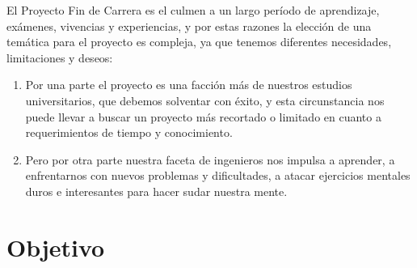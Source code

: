 




El Proyecto Fin de Carrera es el culmen a un largo período de aprendizaje, exámenes, vivencias y
experiencias, y por estas razones la elección de una temática para el proyecto es compleja, ya que
tenemos diferentes necesidades, limitaciones y deseos:
\begin{enumerate}
    \item Por una parte el proyecto es una facción más de nuestros estudios universitarios, que
            debemos solventar con éxito, y esta circunstancia nos puede llevar a buscar un proyecto
            más recortado o limitado en cuanto a requerimientos de tiempo y conocimiento.
    \item Pero por otra parte nuestra faceta de ingenieros nos impulsa a aprender, a enfrentarnos
            con nuevos problemas y dificultades, a atacar ejercicios mentales duros e interesantes
            para hacer sudar nuestra mente.
\end{enumerate}

\section{Objetivo}

